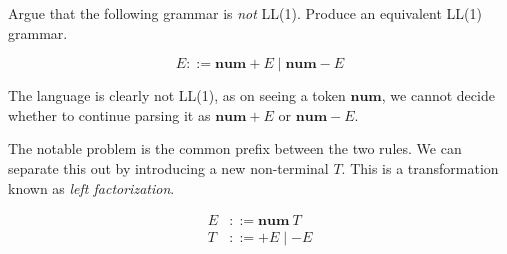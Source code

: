

  



\begin{exercise}{}
  Argue that the following grammar is \emph{not} LL(1). Produce an equivalent
  LL(1) grammar.

  \begin{equation*}
    E ::= \mathbf{num} + E \mid \mathbf{num} - E 
  \end{equation*}

  \begin{solution}
    The language is clearly not LL(1), as on seeing a token \(\mathbf{num}\), we
    cannot decide whether to continue parsing it as \(\mathbf{num} + E\) or
    \(\mathbf{num} - E\). 

    The notable problem is the common prefix between the two rules. We can
    separate this out by introducing a new non-terminal \(T\). This is a
    transformation known as \emph{left factorization}.

    \begin{align*}
      E &::= \mathbf{num} ~T \\
      T &::= + E \mid - E
    \end{align*}


  \end{solution}
\end{exercise}

